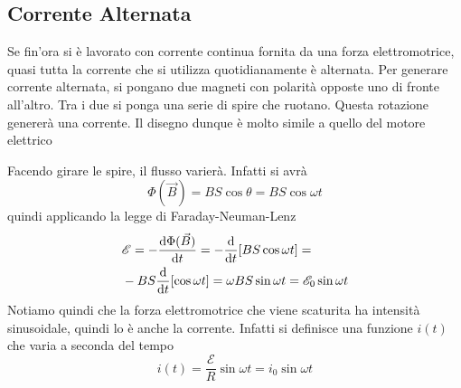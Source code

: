 \subsection{Corrente Alternata}
Se fin'ora si è lavorato con corrente continua fornita da una forza elettromotrice, quasi tutta
la corrente che si utilizza quotidianamente è alternata. Per generare corrente alternata, si
pongano due magneti con polarità opposte uno di fronte all'altro. Tra i due si ponga una serie
di spire che ruotano. Questa rotazione genererà una corrente. Il disegno dunque è molto simile
a quello del motore elettrico
\begin{center}
\end{center}
Facendo girare le spire, il flusso varierà. Infatti si avrà
\begin{equation*}
  \Phi(\vec{B})=BS\cos\theta = BS\cos\omega t
\end{equation*}
quindi applicando la legge di Faraday-Neuman-Lenz
\begin{align*}
  &\mathcal{E} = -\frac{\mathop{}\!\mathrm{d}\Phi(\vec{B})}{\mathop{}\!\mathrm{d} t} = -\frac{\mathop{}\!\mathrm{d}}{\mathop{}\!\mathrm{d} t}[BS\cos\omega t] =\\
  &-BS \frac{\mathop{}\!\mathrm{d}}{\mathop{}\!\mathrm{d} t}[\cos\omega t]=\omega BS\sin\omega t= \mathcal{E}_0\sin\omega t 
\end{align*}
Notiamo quindi che la forza elettromotrice che viene scaturita ha intensità sinusoidale, quindi
lo è anche la corrente. Infatti si definisce una funzione $i(t)$ che varia a seconda del tempo
\begin{equation*}
  i(t) = \frac{\mathcal{E}}{R}\sin\omega t = i_0\sin\omega t
\end{equation*}
